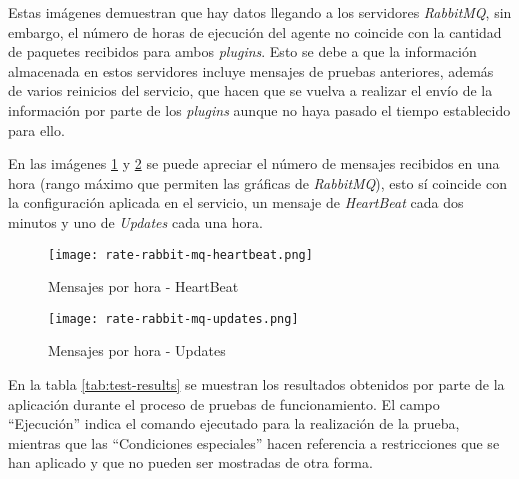         Estas imágenes demuestran que hay datos llegando a los servidores \textit{RabbitMQ}, sin embargo, el número de horas de ejecución del agente no coincide con la cantidad de paquetes recibidos para ambos \textit{plugins}. Esto se debe a que la información almacenada en estos servidores incluye mensajes de pruebas anteriores, además de varios reinicios del servicio, que hacen que se vuelva a realizar el envío de la información por parte de los \textit{plugins} aunque no haya pasado el tiempo establecido para ello.
        
        En las imágenes \ref{fig:rabbitmq-rate-heartbeat} y \ref{fig:rabbitmq-rate-updates} se puede apreciar el número de mensajes recibidos en una hora (rango máximo que permiten las gráficas de \textit{RabbitMQ}), esto sí coincide con la configuración aplicada en el servicio, un mensaje de \textit{HeartBeat} cada dos minutos y uno de \textit{Updates} cada una hora.
        
        \begin{figure}[h!]
        \centering
            \texttt{[image: rate-rabbit-mq-heartbeat.png]}
            \caption{Mensajes por hora - HeartBeat}
            \label{fig:rabbitmq-rate-heartbeat}
        \end{figure}
        
        \begin{figure}[h!]
        \centering
            \texttt{[image: rate-rabbit-mq-updates.png]}
            \caption{Mensajes por hora - Updates}
            \label{fig:rabbitmq-rate-updates}
        \end{figure}
        
        En la tabla \ref{tab:test-results} se muestran los resultados obtenidos por parte de la aplicación durante el proceso de pruebas de funcionamiento. El campo ``Ejecución'' indica el comando ejecutado para la realización de la prueba, mientras que las ``Condiciones especiales'' hacen referencia a restricciones que se han aplicado y que no pueden ser mostradas de otra forma. 

